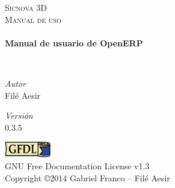 \begin{titlepage}
\begin{center}


\vspace*{5cm}
\textsc{\LARGE Sicnova 3D}\\[1.5cm]

\textsc{\Large Manual de uso}\\[0.5cm]

\HRule \\[0.4cm]
{ \huge \bfseries Manual de usuario de OpenERP \\[0.4cm] }

\HRule \\[1.5cm]


\noindent
\vfill
\begin{minipage}{0.4\textwidth}
\begin{flushleft} \large
\emph{Autor}\\

Filé Aesir
\end{flushleft}
\end{minipage}%
\begin{minipage}{0.4\textwidth}
\begin{flushright} \large
\emph{Versión} \\
0.3.5
\end{flushright}
\end{minipage}
\vspace{2cm}



\includegraphics[width=2cm]{GFDL.png}\\
GNU Free Documentation License v1.3\\
Copyright \copyright 2014 Gabriel Franco -- Filé Aesir

\end{center}
\end{titlepage}

